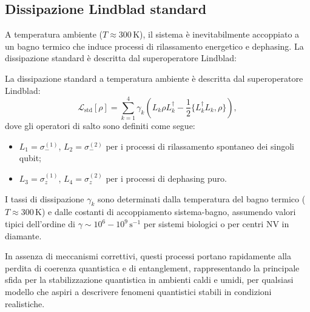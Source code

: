 \documentclass[11pt,a4paper]{article}
\theoremstyle{plain}
\theoremstyle{definition}
\begin{document}
\vspace{0.4cm}



\subsection{Dissipazione Lindblad standard}
\label{subsec:lindblad_std}

\vspace{0.2cm}

A temperatura ambiente ($T \approx 300\,\text{K}$), il sistema è inevitabilmente accoppiato a un bagno termico che induce processi di rilassamento energetico e dephasing. La dissipazione standard è descritta dal superoperatore Lindblad:

\vspace{0.2cm}




\begin{tcolorbox}[colback=blue!3!white, colframe=blue!80!black, title={\textbf{Dissipazione Lindblad standard}}, sharp corners, boxrule=0.8pt, coltitle=white]
La dissipazione standard a temperatura ambiente è descritta dal superoperatore Lindblad:
\begin{equation}
\mathcal{L}_{\text{std}}[\rho] = \sum_{k=1}^{4} \gamma_k \left( L_k \rho L_k^\dagger - \frac{1}{2} \{L_k^\dagger L_k, \rho\} \right),
\label{eq:lindblad_std}
\end{equation}
dove gli operatori di salto sono definiti come segue:
\begin{itemize}
    \item $L_1 = \sigma_-^{(1)}$, $L_2 = \sigma_-^{(2)}$ per i processi di rilassamento spontaneo dei singoli qubit;
    \item $L_3 = \sigma_z^{(1)}$, $L_4 = \sigma_z^{(2)}$ per i processi di dephasing puro.
\end{itemize}
\end{tcolorbox}


\vspace{0.2cm}


I tassi di dissipazione $\gamma_k$ sono determinati dalla temperatura del bagno termico ($T \approx 300\,\text{K}$) e dalle costanti di accoppiamento sistema-bagno, assumendo valori tipici dell'ordine di $\gamma \sim 10^6 - 10^9\,\text{s}^{-1}$ per sistemi biologici o per centri NV in diamante. 

\vspace{0.2cm}


In assenza di meccanismi correttivi, questi processi portano rapidamente alla perdita di coerenza quantistica e di entanglement, rappresentando la principale sfida per la stabilizzazione quantistica in ambienti caldi e umidi, per qualsiasi modello che aspiri a descrivere fenomeni quantistici stabili in condizioni realistiche.
\end{document}
